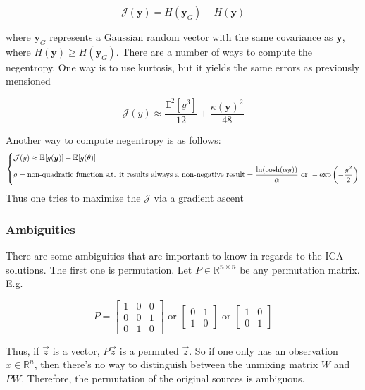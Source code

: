 $$\mathcal{J} (\bm{y}) = H(\bm{y}_G) - H(\bm{y})$$

where $\bm{y}_G$ represents a Gaussian random vector with the same covariance as $\bm{y}$, where $H(\bm{y}) \geq H(\bm{y}_G)$. There are a number of ways to compute the negentropy. One way is to use kurtosis, but it yields the same errors as previously mensioned

$$\mathcal{J}(y) \approx \frac{\mathbb{E}^2[y^3]}{12} + \frac{\kappa(\bm{y})^2}{48}$$

Another way to compute negentropy is as follows:
\begin{equation*}
\begin{dcases}
    \mathcal{J}(y) \approx \mathbb{E}[g(\bm{y})] - \mathbb{E}[g(\theta)] \\
    g = \text{non-quadratic function s.t. it results always a non-negative result} = \frac{\ln(\cosh(\alpha y))}{\alpha} \text{ or } -\exp\left( - \frac{y^2}{2}\right)
\end{dcases}
\end{equation*}
Thus one tries to maximize the $\mathcal{J}$ via a gradient ascent

\subsubsection{Ambiguities}
There are some ambiguities that are important to know in regards to the ICA solutions. The first one is permutation. Let $P \in \mathbb{R}^{n\times n}$ be any permutation matrix. E.g.

\begin{equation*}
    P = \begin{bmatrix} 1 & 0 & 0 \\ 0 & 0 & 1 \\ 0 & 1 & 0 \end{bmatrix} \text{ or } \begin{bmatrix}0 & 1 \\ 1 & 0 \end{bmatrix} \text{ or } \begin{bmatrix} 1 & 0 \\ 0 & 1 \end{bmatrix}
\end{equation*}

Thus, if $\overrightarrow{z}$ is a vector, $P\overrightarrow{z}$ is a permuted $\overrightarrow{z}$. So if one only has an observation $x \in \mathbb{R}^n$, then there's no way to distinguish between the unmixing matrix $W$ and $PW$. Therefore, the permutation of the original sources is ambiguous.

